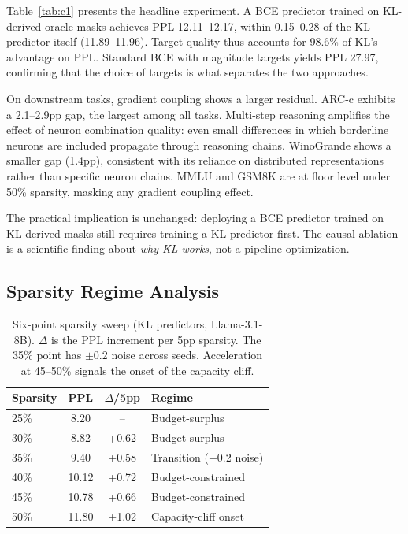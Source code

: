 \documentclass[11pt,a4paper]{article}
\begin{document}
Table~\ref{tab:c1} presents the headline experiment. A BCE predictor trained on KL-derived oracle masks achieves PPL 12.11--12.17, within 0.15--0.28 of the KL predictor itself (11.89--11.96). Target quality thus accounts for 98.6\% of KL's advantage on PPL. Standard BCE with magnitude targets yields PPL 27.97, confirming that the choice of targets is what separates the two approaches.

On downstream tasks, gradient coupling shows a larger residual. ARC-c exhibits a 2.1--2.9pp gap, the largest among all tasks. Multi-step reasoning amplifies the effect of neuron combination quality: even small differences in which borderline neurons are included propagate through reasoning chains. WinoGrande shows a smaller gap (1.4pp), consistent with its reliance on distributed representations rather than specific neuron chains. MMLU and GSM8K are at floor level under 50\% sparsity, masking any gradient coupling effect.

The practical implication is unchanged: deploying a BCE predictor trained on KL-derived masks still requires training a KL predictor first. The causal ablation is a scientific finding about \emph{why KL works}, not a pipeline optimization.

\subsection{Sparsity Regime Analysis}
\label{sec:regime}

\begin{table}[t]
\centering
\caption{Six-point sparsity sweep (KL predictors, Llama-3.1-8B). $\Delta$ is the PPL increment per 5pp sparsity. The 35\% point has $\pm$0.2 noise across seeds. Acceleration at 45--50\% signals the onset of the capacity cliff.}
\label{tab:regime}
\small
\begin{tabular}{lccl}
\toprule
\textbf{Sparsity} & \textbf{PPL} & \textbf{$\Delta$/5pp} & \textbf{Regime} \\
\midrule
25\% & 8.20 & -- & Budget-surplus \\
30\% & 8.82 & +0.62 & Budget-surplus \\
35\% & 9.40 & +0.58 & Transition ($\pm$0.2 noise) \\
40\% & 10.12 & +0.72 & Budget-constrained \\
45\% & 10.78 & +0.66 & Budget-constrained \\
50\% & 11.80 & +1.02 & Capacity-cliff onset \\
\bottomrule
\end{tabular}
\end{table}
\end{document}
